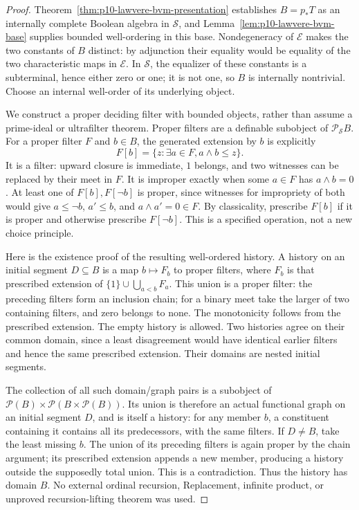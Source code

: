 \begin{proof}
Theorem~\ref{thm:p10-lawvere-bvm-presentation} establishes \(B=p_*T\)
as an internally complete Boolean algebra in \(\mathcal S\), and
Lemma~\ref{lem:p10-lawvere-bvm-base} supplies bounded well-ordering
in this base. Nondegeneracy of \(\mathcal E\)
makes the two constants of \(B\) distinct: by adjunction their
equality would be equality of the two characteristic maps in
\(\mathcal E\). In \(\mathcal S\), the equalizer of these
constants is a subterminal, hence either zero or one; it is not one,
so \(B\) is internally nontrivial. Choose an internal well-order
of its underlying object.

We construct a proper deciding filter with bounded objects, rather
than assume a prime-ideal or ultrafilter theorem. Proper filters are
a definable subobject of \(\mathcal P_{\mathcal S}B\).
For a proper filter \(F\) and \(b\in B\), the generated
extension by \(b\) is explicitly
\[
       F[b]=\{z:\exists a\in F, a\wedge b\le z\}.
\]
It is a filter: upward closure is immediate, \(1\) belongs, and
two witnesses can be replaced by their meet in \(F\).
It is improper exactly when some \(a\in F\) has \(a\wedge b=0\).
At least one of \(F[b],F[\neg b]\) is proper, since witnesses
for impropriety of both would give \(a\le\neg b\),
\(a'\le b\), and \(a\wedge a'=0\in F\).
By classicality, prescribe \(F[b]\) if it is proper and otherwise
prescribe \(F[\neg b]\). This is a specified operation, not a
new choice principle.

Here is the existence proof of the resulting well-ordered history.
A history on an initial segment \(D\subseteq B\) is a map
\(b\mapsto F_b\) to proper filters, where \(F_b\) is that
prescribed extension of
\(\{1\}\cup\bigcup_{a<b}F_a\). This union is a proper
filter: the preceding filters form an inclusion chain; for a binary
meet take the larger of two containing filters, and zero belongs
to none. The monotonicity follows from the prescribed extension.
The empty history is allowed. Two histories agree on their common
domain, since a least disagreement would have identical earlier
filters and hence the same prescribed extension. Their domains are
nested initial segments.

The collection of all such domain/graph pairs is a subobject of
\(\mathcal P(B)\times\mathcal P(B\times\mathcal P(B))\).
Its union is therefore an actual functional graph on an initial
segment \(D\), and is itself a history: for any member \(b\),
a constituent containing it contains all its predecessors, with
the same filters. If \(D\ne B\), take the least missing \(b\).
The union of its preceding filters is again proper by the chain
argument; its prescribed extension appends a new member, producing
a history outside the supposedly total union. This is a contradiction.
Thus the history has domain \(B\). No external ordinal recursion,
Replacement, infinite product, or unproved recursion-lifting theorem
was used.


\end{proof}
